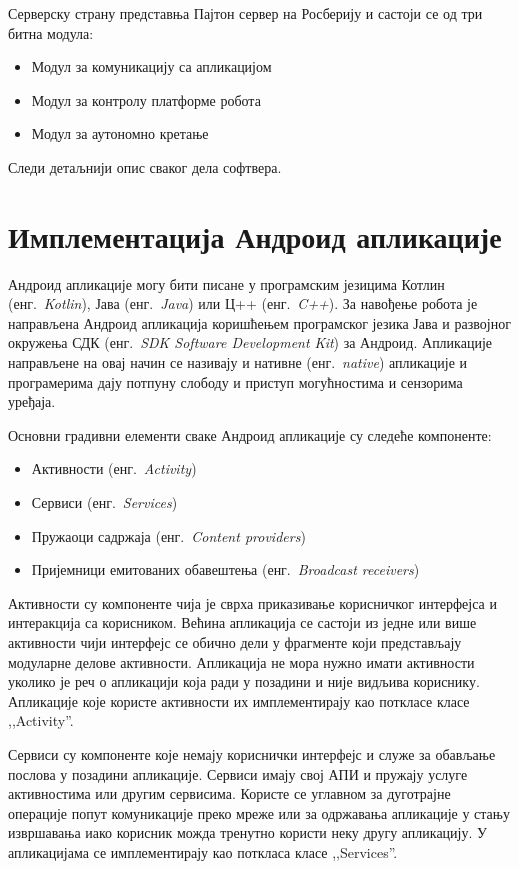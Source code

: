 \documentclass[12pt,oneside]{memoir}
\theoremstyle{remark}
\begin{document}
Серверску страну представња Пајтон сервер на Росберију и састоји се од три битна модула:
\begin{itemize}
\item Модул за комуникацију са апликацијом
\item Модул за контролу платформе робота
\item Модул за аутономно кретање
\end{itemize}

Следи детаљнији опис сваког дела софтвера.

\section{Имплементација Андроид апликације}
Андроид апликације могу бити писане у програмским језицима Котлин (енг.~{\em Kotlin}), Јава (енг.~{\em Java}) или Ц++ (енг.~{\em C++}). За навођење робота је направљена Андроид апликација коришћењем програмског језика Јава и развојног окружења СДК (енг.~{\em SDK Software Development Kit}) за Андроид. Апликације направљене на овај начин се називају и нативне (енг.~{\em native}) апликације и програмерима дају потпуну слободу и приступ могућностима и сензорима уређаја. 

Основни градивни елементи сваке Андроид апликације су следеће компоненте:
\begin{itemize}
\item Активности  (енг.~{\em Activity})
\item Сервиси (енг.~{\em Services})
\item Пружаоци садржаја (енг.~{\em Content providers})
\item Пријемници емитованих обавештења (енг.~{\em Broadcast receivers})
\end{itemize}

Активности су компоненте чија је сврха приказивање корисничког интерфејса и интеракција са корисником. Већина апликација се састоји из једне или више активности чији интерфејс се обично дели у фрагменте који представљају модуларне делове активности. Апликација не мора нужно имати активности уколико је реч о апликацији која ради у позадини и није видљива кориснику. Апликације које користе активности их имплементирају као поткласе класе ,,Activity''.

Сервиси су компоненте које немају кориснички интерфејс и служе за обављање послова у позадини апликације. Сервиси имају свој АПИ и пружају услуге активностима или другим сервисима. Користе се углавном за дуготрајне операције попут комуникације преко мреже или за одржавања апликације у стању извршавања иако корисник можда тренутно користи неку другу апликацију. У апликацијама се имплементирају као поткласа класе ,,Services''.
\end{document}
